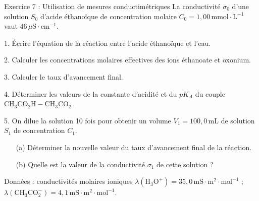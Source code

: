 \documentclass[12pt, french]{article}
\begin{document}
\begin{Box2}{Exercice 7 : Utilisation de mesures conductimétriques}
La conductivité $\sigma_0$ d’une solution $S_0$ d’acide éthanoïque de concentration molaire $C_0 = 1,00 \, \text{mmol} \cdot \text{L}^{-1}$ vaut $46 \, \mu\text{S} \cdot \text{cm}^{-1}$.

1. Écrire l’équation de la réaction entre l’acide éthanoïque et l’eau.

2. Calculer les concentrations molaires effectives des ions éthanoate et oxonium.

3. Calculer le taux d’avancement final.

4. Déterminer les valeurs de la constante d’acidité et du $pK_A$ du couple $\text{CH}_3 \text{CO}_2 \text{H} - \text{CH}_3 \text{CO}_2^{-}$.

5. On dilue la solution 10 fois pour obtenir un volume $V_1 = 100,0 \, \text{mL}$ de solution $S_1$ de concentration $C_1$.
  \begin{itemize}
    \item[(a)] Déterminer la nouvelle valeur du taux d’avancement final de la réaction.
    \item[(b)] Quelle est la valeur de la conductivité $\sigma_1$ de cette solution ?
  \end{itemize}

Données : conductivités molaires ioniques $\lambda (\text{H}_3 \text{O}^+ ) = 35,0 \, \text{mS} \cdot \text{m}^2 \cdot \text{mol}^{-1}$ ; $\lambda (\text{CH}_3 \text{CO}_2^-) = 4,1 \, \text{mS} \cdot \text{m}^2 \cdot \text{mol}^{-1}$.
\end{Box2}
\end{document}
